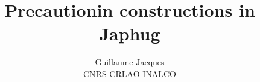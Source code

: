 \documentclass{article}
\begin{document}
 
\title{Precautionin constructions in Japhug}
\author{Guillaume Jacques\\ CNRS-CRLAO-INALCO}
\maketitle



 
\end{document}
